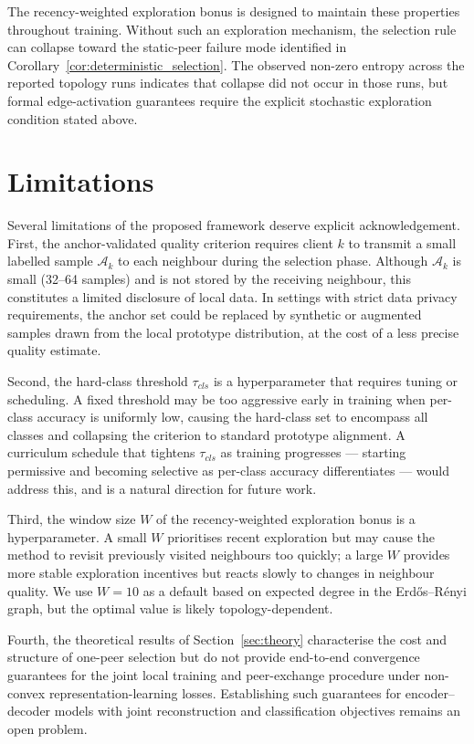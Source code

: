 \documentclass[conference]{IEEEtran}
\newcommand{\rev}[1]{{\color{red}#1}}
\begin{document}
\rev{The recency-weighted exploration bonus is designed to maintain these properties throughout training. Without such an exploration mechanism, the selection rule can collapse toward the static-peer failure mode identified in Corollary~\ref{cor:deterministic_selection}. The observed non-zero entropy across the reported topology runs indicates that collapse did not occur in those runs, but formal edge-activation guarantees require the explicit stochastic exploration condition stated above.}



\section{Limitations}
\label{sec:limitations}

Several limitations of the proposed framework deserve explicit acknowledgement. First, the anchor-validated quality criterion requires client \(k\) to transmit a small labelled sample \(\mathcal{A}_k\) to each neighbour during the selection phase. Although \(\mathcal{A}_k\) is small (32--64 samples) and is not stored by the receiving neighbour, this constitutes a limited disclosure of local data. In settings with strict data privacy requirements, the anchor set could be replaced by synthetic or augmented samples drawn from the local prototype distribution, at the cost of a less precise quality estimate.

Second, the hard-class threshold \(\tau_{cls}\) is a hyperparameter that requires tuning or scheduling. A fixed threshold may be too aggressive early in training when per-class accuracy is uniformly low, causing the hard-class set to encompass all classes and collapsing the criterion to standard prototype alignment. A curriculum schedule that tightens $\tau_{cls}$ as training progresses --- starting permissive and becoming selective as per-class accuracy differentiates --- would address this, and is a natural direction for future work.

Third, the window size \(W\) of the recency-weighted exploration bonus is a hyperparameter. A small \(W\) prioritises recent exploration but may cause the method to revisit previously visited neighbours too quickly; a large \(W\) provides more stable exploration incentives but reacts slowly to changes in neighbour quality. We use \(W = 10\) as a default based on expected degree in the Erd\H{o}s--R\'{e}nyi graph, but the optimal value is likely topology-dependent.

Fourth, the theoretical results of Section~\ref{sec:theory} characterise the cost and structure of one-peer selection but do not provide end-to-end convergence guarantees for the joint local training and peer-exchange procedure under non-convex representation-learning losses. Establishing such guarantees for encoder--decoder models with joint reconstruction and classification objectives remains an open problem.
\end{document}
